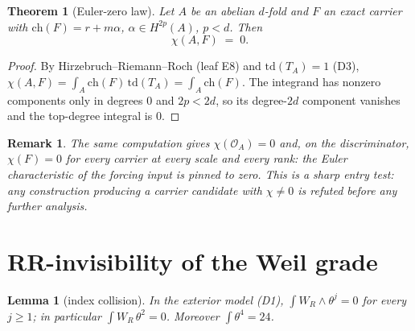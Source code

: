 \documentclass[11pt]{article}
\newtheorem{theorem}{Theorem}
\newtheorem{lemma}{Lemma}
\newtheorem{remark}{Remark}
\begin{document}
\begin{theorem}[Euler-zero law]\label{thm:eulerzero}
Let $A$ be an abelian $d$-fold and $F$ an exact carrier with $\mathrm{ch}(F)=r+m\alpha$,
$\alpha\in H^{2p}(A)$, $p<d$. Then
\[
\chi(A,F)\;=\;0 .
\]
\end{theorem}

\begin{proof}
By Hirzebruch--Riemann--Roch (leaf E8) and $\mathrm{td}(T_A)=1$ (D3),
$\chi(A,F)=\int_A\mathrm{ch}(F)\,\mathrm{td}(T_A)=\int_A \mathrm{ch}(F)$. The integrand has nonzero
components only in degrees $0$ and $2p<2d$, so its degree-$2d$ component vanishes and the top-degree
integral is $0$.
\end{proof}

\begin{remark}
The same computation gives $\chi(\mathcal{O}_A)=0$ and, on the discriminator, $\chi(F)=0$ for every
carrier at every scale and every rank: \emph{the Euler characteristic of the forcing input is pinned to
zero}. This is a sharp entry test: any construction producing a carrier candidate with
$\chi\neq0$ is refuted before any further analysis.
\end{remark}

\section{RR-invisibility of the Weil grade}\label{sec:invisible}

\begin{lemma}[index collision]\label{lem:collision}
In the exterior model (D1), $\int W_R\wedge\theta^j=0$ for every $j\ge1$; in particular
$\int W_R\,\theta^2=0$. Moreover $\int\theta^4=24$.
\end{lemma}
\end{document}

